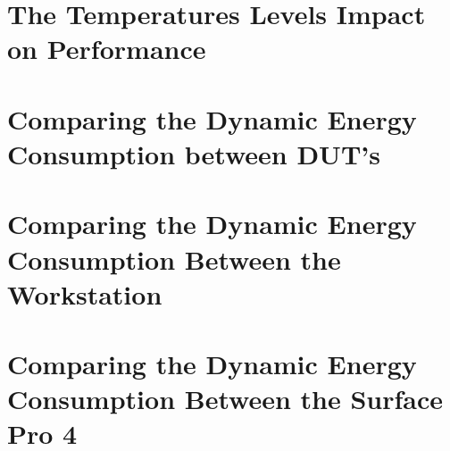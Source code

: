 \section{The Temperatures Levels Impact on Performance}\label{app:temperature}



\newpage


\section{Comparing the Dynamic Energy Consumption between DUT's}\label{app:comparison}



% 
% 
\newpage


\section{Comparing the Dynamic Energy Consumption Between the Workstation}\label{app:comparison_workstation}
% 
% 



\newpage

\section{Comparing the Dynamic Energy Consumption Between the Surface Pro 4}\label{app:comparison_surfacepro4}
% 
% 

